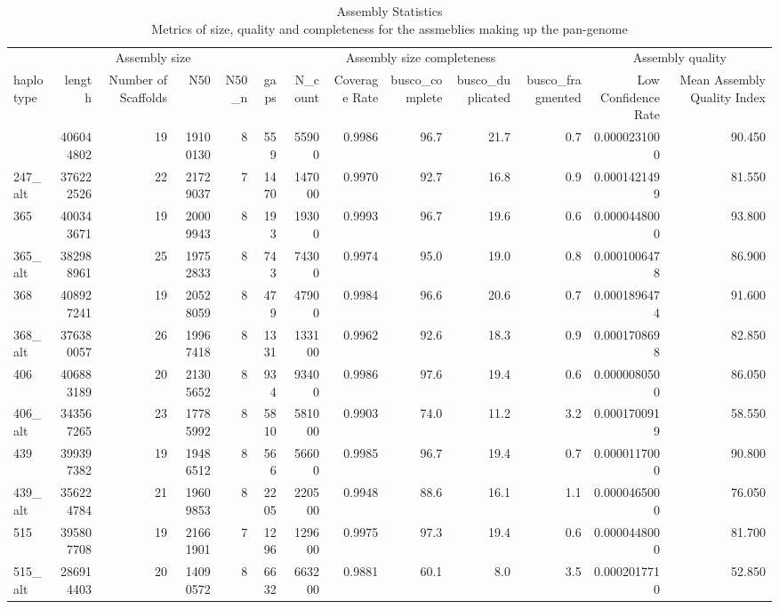 \begin{table}[!t]
\caption*{
{\large Assembly Statistics} \\ 
{\small Metrics of size, quality and completeness for the assmeblies making up the pan-genome}
} 
\fontsize{12.0pt}{14.4pt}\selectfont
\begin{tabular*}{\linewidth}{@{\extracolsep{\fill}}lrrrrrrrrrrrr}
\toprule
 & \multicolumn{4}{c}{Assembly size} & \multicolumn{6}{c}{Assembly size completeness} & \multicolumn{2}{c}{Assembly quality} \\ 
\cmidrule(lr){2-5} \cmidrule(lr){6-11} \cmidrule(lr){12-13}
haplotype & length & Number of Scaffolds & N50 & N50\_n & gaps & N\_count & Coverage Rate & busco\_complete & busco\_duplicated & busco\_fragmented & Low Confidence Rate & Mean Assembly Quality Index \\ 
\midrule\addlinespace[2.5pt]
247 & 406044802 & 19 & 19100130 & 8 & 559 & 55900 & 0.9986 & 96.7 & 21.7 & 0.7 & 0.0000231000 & 90.450 \\ 
247\_alt & 376222526 & 22 & 21729037 & 7 & 1470 & 147000 & 0.9970 & 92.7 & 16.8 & 0.9 & 0.0001421499 & 81.550 \\ 
365 & 400343671 & 19 & 20009943 & 8 & 193 & 19300 & 0.9993 & 96.7 & 19.6 & 0.6 & 0.0000448000 & 93.800 \\ 
365\_alt & 382988961 & 25 & 19752833 & 8 & 743 & 74300 & 0.9974 & 95.0 & 19.0 & 0.8 & 0.0001006478 & 86.900 \\ 
368 & 408927241 & 19 & 20528059 & 8 & 479 & 47900 & 0.9984 & 96.6 & 20.6 & 0.7 & 0.0001896474 & 91.600 \\ 
368\_alt & 376380057 & 26 & 19967418 & 8 & 1331 & 133100 & 0.9962 & 92.6 & 18.3 & 0.9 & 0.0001708698 & 82.850 \\ 
406 & 406883189 & 20 & 21305652 & 8 & 934 & 93400 & 0.9986 & 97.6 & 19.4 & 0.6 & 0.0000080500 & 86.050 \\ 
406\_alt & 343567265 & 23 & 17785992 & 8 & 5810 & 581000 & 0.9903 & 74.0 & 11.2 & 3.2 & 0.0001700919 & 58.550 \\ 
439 & 399397382 & 19 & 19486512 & 8 & 566 & 56600 & 0.9985 & 96.7 & 19.4 & 0.7 & 0.0000117000 & 90.800 \\ 
439\_alt & 356224784 & 21 & 19609853 & 8 & 2205 & 220500 & 0.9948 & 88.6 & 16.1 & 1.1 & 0.0000465000 & 76.050 \\ 
515 & 395807708 & 19 & 21661901 & 7 & 1296 & 129600 & 0.9975 & 97.3 & 19.4 & 0.6 & 0.0000448000 & 81.700 \\ 
515\_alt & 286914403 & 20 & 14090572 & 8 & 6632 & 663200 & 0.9881 & 60.1 & 8.0 & 3.5 & 0.0002017710 & 52.850 \\ 

\end{tabular*}
\end{table}
